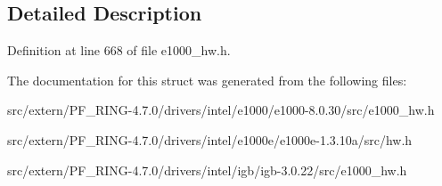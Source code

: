 \subsection{Detailed Description}


Definition at line 668 of file e1000\_\-hw.h.



The documentation for this struct was generated from the following files:\begin{DoxyCompactItemize}
\item 
src/extern/PF\_\-RING-\/4.7.0/drivers/intel/e1000/e1000-\/8.0.30/src/e1000\_\-hw.h\item 
src/extern/PF\_\-RING-\/4.7.0/drivers/intel/e1000e/e1000e-\/1.3.10a/src/hw.h\item 
src/extern/PF\_\-RING-\/4.7.0/drivers/intel/igb/igb-\/3.0.22/src/e1000\_\-hw.h\end{DoxyCompactItemize}
